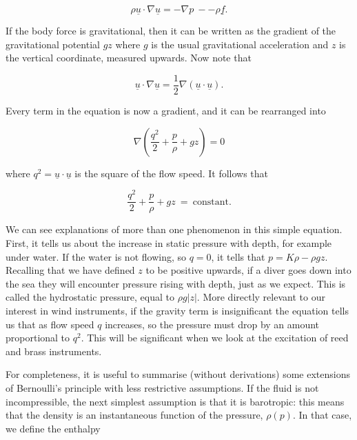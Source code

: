   \begin{equation*}\rho \underline{u} \cdot \nabla \underline{u}= -\nabla p 
  \mathrm{~} -- \rho \underline{f} . \tag{23}\end{equation*} 

  If the body force is gravitational, then it can be written as the gradient of 
  the gravitational potential $gz$ where $g$ is the usual gravitational 
  acceleration and $z$ is the vertical coordinate, measured upwards. Now note 
  that 

  \begin{equation*}\underline{u} \cdot \nabla \underline{u} = \frac{1}{2} 
  \nabla (\underline{u} \cdot \underline{u}) . \tag{24}\end{equation*} 

  Every term in the equation is now a gradient, and it can be rearranged into 

  \begin{equation*}\nabla \left(\dfrac{q^2}{2}+\dfrac{p}{\rho}+gz\right) = 0 
  \tag{25}\end{equation*} 

  \noindent{}where $q^2=\underline{u} \cdot \underline{u}$ is the square of the 
  flow speed. It follows that 

  \begin{equation*}\dfrac{q^2}{2}+\dfrac{p}{\rho}+gz\ = \mathrm{~constant.} 
  \tag{26}\end{equation*} 

  We can see explanations of more than one phenomenon in this simple equation. 
  First, it tells us about the increase in static pressure with depth, for 
  example under water. If the water is not flowing, so $q=0$, it tells that 
  $p=K \rho-\rho g z$. Recalling that we have defined $z$ to be positive 
  upwards, if a diver goes down into the sea they will encounter pressure 
  rising with depth, just as we expect. This is called the hydrostatic 
  pressure, equal to $\rho g |z|$. More directly relevant to our interest in 
  wind instruments, if the gravity term is insignificant the equation tells us 
  that as flow speed $q$ increases, so the pressure must drop by an amount 
  proportional to $q^2$. This will be significant when we look at the 
  excitation of reed and brass instruments. 

  For completeness, it is useful to summarise (without derivations) some 
  extensions of Bernoulli's principle with less restrictive assumptions. If the 
  fluid is not incompressible, the next simplest assumption is that it is 
  barotropic: this means that the density is an instantaneous function of the 
  pressure, $\rho(p)$. In that case, we define the enthalpy 

